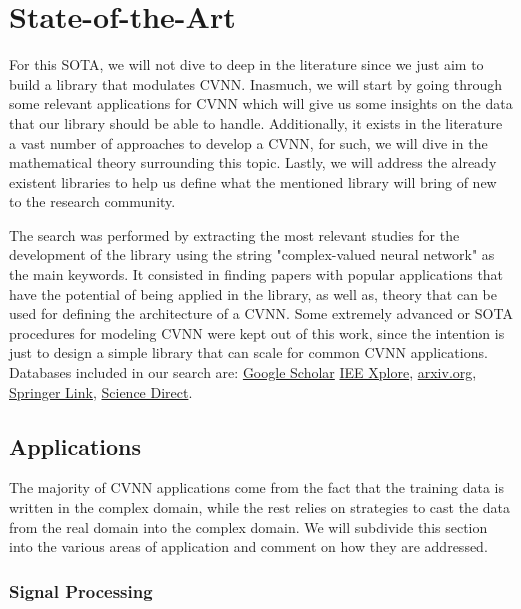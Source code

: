 
\chapter{State-of-the-Art}
\label{sec:chap1_sota}

For this \gls{SOTA}, we will not dive to deep in the literature since we just aim to build a library that modulates \gls{CVNN}. Inasmuch, we will start by going through some relevant applications for \gls{CVNN} which will give us some insights on the data that our library should be able to handle. Additionally, it exists in the literature a vast number of approaches to develop a \gls{CVNN}, for such, we will dive in the mathematical theory surrounding this topic. Lastly, we will address the already existent libraries to help us define what the mentioned library will bring of new to the research community.

The search was performed by extracting the most relevant studies for the development of the library using the string "complex-valued neural network" as the main keywords. It consisted in finding papers with popular applications that have the potential of being applied in the library, as well as, theory that can be used for defining the architecture of a \gls{CVNN}. Some extremely advanced or \gls{SOTA} procedures for modeling \gls{CVNN} were kept out of this work, since the intention is just to design a simple library that can scale for common \gls{CVNN} applications. Databases included in our search are: \href{https://scholar.google.com/}{Google Scholar} \href{https://ieeexplore.ieee.org/Xplore/home.jsp}{IEE Xplore}, \href{https://arxiv.org/}{arxiv.org}, \href{https://link.springer.com/}{Springer Link}, \href{https://www.sciencedirect.com/}{Science Direct}.

\section{Applications}
The majority of \gls{CVNN} applications come from the fact that the training data is written in the complex domain, while the rest relies on strategies to cast the data from the real domain into the complex domain. We will subdivide this section into the various areas of application and comment on how they are addressed.

\subsection{Signal Processing}

